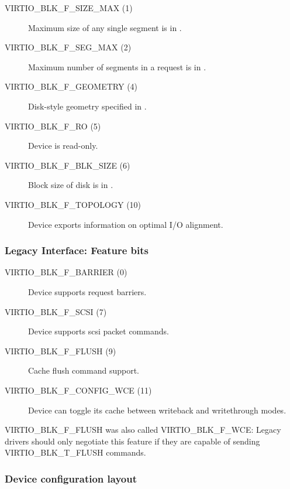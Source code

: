 \begin{description}
\item[VIRTIO_BLK_F_SIZE_MAX (1)] Maximum size of any single segment is
    in .

\item[VIRTIO_BLK_F_SEG_MAX (2)] Maximum number of segments in a
    request is in .

\item[VIRTIO_BLK_F_GEOMETRY (4)] Disk-style geometry specified in
    .

\item[VIRTIO_BLK_F_RO (5)] Device is read-only.

\item[VIRTIO_BLK_F_BLK_SIZE (6)] Block size of disk is in .

\item[VIRTIO_BLK_F_TOPOLOGY (10)] Device exports information on optimal I/O
    alignment.
\end{description}

\subsubsection{Legacy Interface: Feature bits}\label{sec:Device Types / Block Device / Feature bits / Legacy Interface: Feature bits}

\begin{description}
\item[VIRTIO_BLK_F_BARRIER (0)] Device supports request barriers.

\item[VIRTIO_BLK_F_SCSI (7)] Device supports scsi packet commands.

\item[VIRTIO_BLK_F_FLUSH (9)] Cache flush command support.

\item[VIRTIO_BLK_F_CONFIG_WCE (11)] Device can toggle its cache between writeback
    and writethrough modes.
\end{description}

VIRTIO_BLK_F_FLUSH was also called VIRTIO_BLK_F_WCE: Legacy drivers
should only negotiate this feature if they are capable of sending
VIRTIO_BLK_T_FLUSH commands.

\subsubsection{Device configuration layout}\label{sec:Device Types / Block Device / Feature bits / Device configuration layout}

